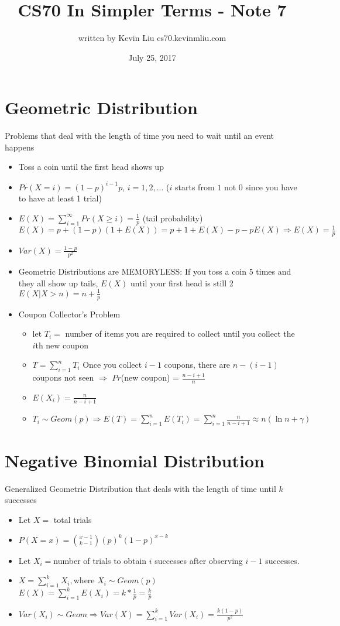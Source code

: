 \documentclass[a4paper]{article}
\title{CS70 In Simpler Terms - Note 7}
\author{written by Kevin Liu cs70.kevinmliu.com}
\date{July 25, 2017}
\begin{document}
\maketitle

\section{Geometric Distribution}
Problems that deal with the length of time you need to wait until an event happens
\begin{itemize}
    \item Toss a coin until the first head shows up
    \item $Pr(X=i) = (1-p)^{i-1}p$, $i = 1,2,...$ ($i$ starts from $1$ not 0 since you have to have at least 1 trial)
    \item $E(X) = \sum_{i=1}^\infty Pr(X \geq i) = \frac{1}{p}$ (tail probability)\\
    $E(X) = p + (1-p)(1+E(X)) = p + 1 + E(X) -p -pE(X) \Rightarrow E(X) = \frac{1}{p}$
    \item $Var(X) = \frac{1-p}{p^2}$
    \item Geometric Distributions are MEMORYLESS: If you toss a coin 5 times and they all show up tails, $E(X)$ until your first head is still 2\\
    $E(X|X>n) = n + \frac{1}{p}$
    \item Coupon Collector's Problem
    \begin{itemize}
        \item let $T_i = $ number of items you are required to collect until you collect the $i$th new coupon
        \item $T = \sum_{i=1}^nT_i$ Once you collect $i - 1$ coupons, there are $n-(i-1)$ coupons not seen $\Rightarrow$ $Pr$(new coupon) = $\frac{n-i+1}{n}$
        \item $E(X_i) = \frac{n}{n-i+1}$
        \item $T_i \sim Geom(p) \Rightarrow E(T) = \sum_{i=1}^nE(T_i) = \sum_{i=1}^n\frac{n}{n-i+1} \approx n(\ln n + \gamma)$
    \end{itemize}
\end{itemize}

\section{Negative Binomial Distribution}
Generalized Geometric Distribution that deals with the length of time until $k$ successes
\begin{itemize}
    \item Let $X = $ total trials
    \item $P(X=x) = \binom{x-1}{k-1}(p)^{k}(1-p)^{x-k}$ 
    \item Let $X_i = $number of trials to obtain $i$ successes after observing $i-1$ successes.
    \item $X = \sum_{i=1}^kX_i, $where $X_i \sim Geom(p)$\\
    $E(X) = \sum_{i=1}^kE(X_i) = k*\frac{1}{p} = \frac{k}{p}$
    \item $Var(X_i) \sim Geom \Rightarrow Var(X) = \sum_{i = 1}^kVar(X_i) = \frac{k(1-p)}{p^2}$
\end{itemize}
\end{document}
